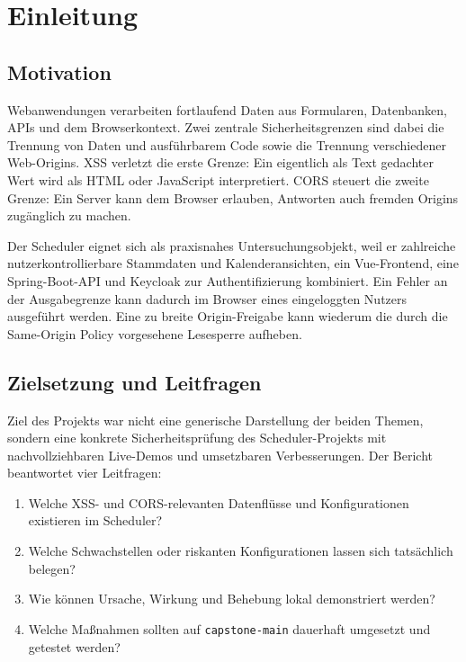 \section{Einleitung}
\label{sec:einleitung}

\subsection{Motivation}

Webanwendungen verarbeiten fortlaufend Daten aus Formularen,
Datenbanken, APIs und dem Browserkontext. Zwei zentrale
Sicherheitsgrenzen sind dabei die Trennung von Daten und ausführbarem
Code sowie die Trennung verschiedener Web-Origins. XSS verletzt die
erste Grenze: Ein eigentlich als Text gedachter Wert wird als HTML
oder JavaScript interpretiert. CORS steuert die zweite Grenze: Ein
Server kann dem Browser erlauben, Antworten auch fremden Origins
zugänglich zu machen.

Der Scheduler eignet sich als praxisnahes Untersuchungsobjekt, weil
er zahlreiche nutzerkontrollierbare Stammdaten und Kalenderansichten,
ein Vue-Frontend, eine Spring-Boot-API und Keycloak zur
Authentifizierung kombiniert. Ein Fehler an der Ausgabegrenze kann
dadurch im Browser eines eingeloggten Nutzers ausgeführt werden. Eine
zu breite Origin-Freigabe kann wiederum die durch die Same-Origin
Policy vorgesehene Lesesperre aufheben.

\subsection{Zielsetzung und Leitfragen}

Ziel des Projekts war nicht eine generische Darstellung der beiden
Themen, sondern eine konkrete Sicherheitsprüfung des
Scheduler-Projekts mit nachvollziehbaren Live-Demos und umsetzbaren
Verbesserungen. Der Bericht beantwortet vier Leitfragen:

\begin{enumerate}
  \item Welche XSS- und CORS-relevanten Datenflüsse und
    Konfigurationen existieren im Scheduler?
  \item Welche Schwachstellen oder riskanten Konfigurationen lassen
    sich tatsächlich belegen?
  \item Wie können Ursache, Wirkung und Behebung lokal demonstriert werden?
  \item Welche Maßnahmen sollten auf \texttt{capstone-main} dauerhaft
    umgesetzt und getestet werden?
\end{enumerate}

